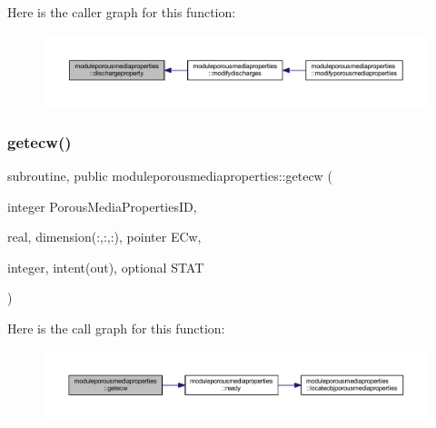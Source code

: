 Here is the caller graph for this function\+:\nopagebreak
\begin{figure}[H]
\begin{center}
\leavevmode
\includegraphics[width=350pt]{namespacemoduleporousmediaproperties_a0e66cb3f0270a54dfa87774f558ac3d5_icgraph}
\end{center}
\end{figure}
\mbox{\label{namespacemoduleporousmediaproperties_a24f7231dc218de6931238c8726e07bf9}} 
\subsubsection{\texorpdfstring{getecw()}{getecw()}}
{\footnotesize\ttfamily subroutine, public moduleporousmediaproperties\+::getecw (\begin{DoxyParamCaption}\item[{integer}]{Porous\+Media\+Properties\+ID,  }\item[{real, dimension(\+:,\+:,\+:), pointer}]{E\+Cw,  }\item[{integer, intent(out), optional}]{S\+T\+AT }\end{DoxyParamCaption})}

Here is the call graph for this function\+:\nopagebreak
\begin{figure}[H]
\begin{center}
\leavevmode
\includegraphics[width=350pt]{namespacemoduleporousmediaproperties_a24f7231dc218de6931238c8726e07bf9_cgraph}
\end{center}
\end{figure}
\mbox{\label{namespacemoduleporousmediaproperties_a7f77a3cf092866b51da8931bff80a9e3}} 
